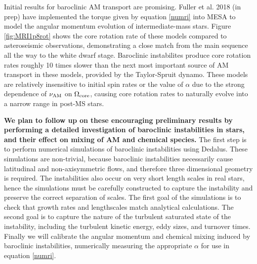 Initial results for baroclinic AM transport are promising. Fuller et al. 2018 (in prep) have implemented the torque given by equation \ref{numri} into MESA to model the angular momentum evolution of intermediate-mass stars. Figure \ref{fig:MRI1p8rot} shows the core rotation rate of these models compared to asteroseismic observations, demonstrating a close match from the main sequence all the way to the white dwarf stage. Baroclinic instabilites produce core rotation rates roughly 10 times slower than the next most important source of AM transport in these models, provided by the Taylor-Spruit dynamo. These models are relatively insensitive to initial spin rates or the value of $\alpha$ due to the strong dependence of $\nu_{\rm AM}$ on $\Omega_{\rm core}$, causing core rotation rates to naturally evolve into a narrow range in post-MS stars.

{\bf We plan to follow up on these encouraging preliminary results by performing a detailed investigation of baroclinic instabilities in stars, and their effect on mixing of AM and chemical species.} The first step is to perform numerical simulations of baroclinic instabilities using Dedalus. These simulations are non-trivial, because baroclinic instabilities necessarily cause latitudinal and non-axisymmetric flows, and therefore three dimensional geometry is required. The instabilities also occur on very short length scales in real stars, hence the simulations must be carefully constructed to capture the instability and preserve the correct separation of scales. The first goal of the simulations is to check that growth rates and lengthscales match analytical calculations. The second goal is to capture the nature of the turbulent saturated state of the instability, including the turbulent kinetic energy, eddy sizes, and turnover times. Finally we will calibrate the angular momentum and chemical mixing induced by baroclinic instabilities, numerically measuring the appropriate $\alpha$ for use in equation \ref{numri}.